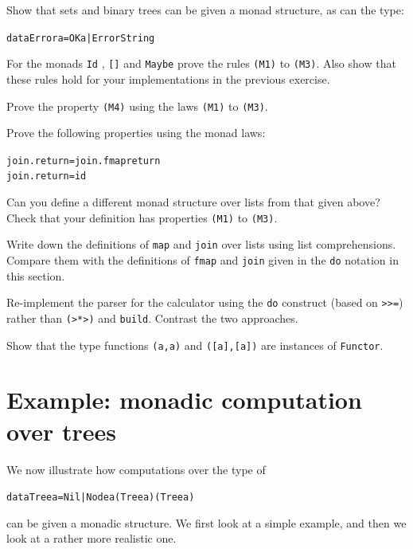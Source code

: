 \begin{exercises}

\item
Show that sets and binary trees
can be given a monad structure, as can the type:
\begin{alltt}
data Error a = OK a | Error String
\end{alltt}

\item
For the monads \texttt{Id} , \texttt{[]} and \texttt{Maybe} prove the rules 
\texttt{(M1)} to \texttt{(M3)}. Also show that
these rules hold for your implementations in the
previous exercise.

\item
Prove the property \texttt{(M4)} using the laws \texttt{(M1)} to \texttt{(M3)}.

\item 
Prove the following properties using the monad laws:
\begin{alltt}
join . return = join . fmap return
join . return = id
\end{alltt}

\item
Can you define a different monad structure over lists from that given above?
Check that your definition has properties \texttt{(M1)} to \texttt{(M3)}.

\item
Write down the definitions of \texttt{map} and \texttt{join} over lists
using list comprehensions. Compare them with the definitions of
\texttt{fmap} and \texttt{join} given in the \texttt{do} notation in this section.

\item
Re-implement the parser for the calculator using the \texttt{do}
construct (based on \texttt{>>=}) 
rather than \texttt{(>*>)} and \texttt{build}. Contrast the two
approaches.

\item
Show that the type functions \texttt{(a,a)} and \texttt{([a],[a])} are instances of \texttt{Functor}.

\end{exercises}



\section{Example: monadic computation over trees}
\label{monadicTrees}

We now illustrate how computations over the type of 
\begin{alltt}
data Tree a = Nil | Node a (Tree a) (Tree a)
\end{alltt}
can be given a monadic structure. We first look at a simple example, and then
we look at a rather more realistic one. 

